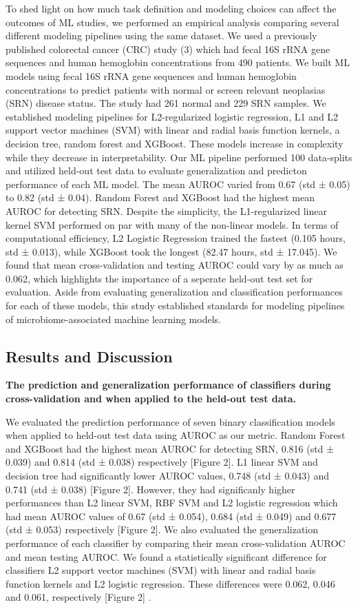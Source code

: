 \documentclass[11pt,]{article}
\begin{document}
To shed light on how much task definition and modeling choices can
affect the outcomes of ML studies, we performed an empirical analysis
comparing several different modeling pipelines using the same dataset.
We used a previously published colorectal cancer (CRC) study (3) which
had fecal 16S rRNA gene sequences and human hemoglobin concentrations
from 490 patients. We built ML models using fecal 16S rRNA gene
sequences and human hemoglobin concentrations to predict patients with
normal or screen relevant neoplasias (SRN) disease status. The study had
261 normal and 229 SRN samples. We established modeling pipelines for
L2-regularized logistic regression, L1 and L2 support vector machines
(SVM) with linear and radial basis function kernels, a decision tree,
random forest and XGBoost. These models increase in complexity while
they decrease in interpretability. Our ML pipeline performed 100
data-splits and utilized held-out test data to evaluate generalization
and predicton performance of each ML model. The mean AUROC varied from
0.67 (std ± 0.05) to 0.82 (std ± 0.04). Random Forest and XGBoost had
the highest mean AUROC for detecting SRN. Despite the simplicity, the
L1-regularized linear kernel SVM performed on par with many of the
non-linear models. In terms of computational efficiency, L2 Logistic
Regression trained the fastest (0.105 hours, std ± 0.013), while XGBoost
took the longest (82.47 hours, std ± 17.045). We found that mean
cross-validation and testing AUROC could vary by as much as 0.062, which
highlights the importance of a seperate held-out test set for
evaluation. Aside from evaluating generalization and classification
performances for each of these models, this study established standards
for modeling pipelines of microbiome-associated machine learning models.

\subsection{Results and Discussion}\label{results-and-discussion}

\textbf{The prediction and generalization performance of classifiers
during cross-validation and when applied to the held-out test data.}

We evaluated the prediction performance of seven binary classification
models when applied to held-out test data using AUROC as our metric.
Random Forest and XGBoost had the highest mean AUROC for detecting SRN,
0.816 (std ± 0.039) and 0.814 (std ± 0.038) respectively {[}Figure 2{]}.
L1 linear SVM and decision tree had significantly lower AUROC values,
0.748 (std ± 0.043) and 0.741 (std ± 0.038) {[}Figure 2{]}. However,
they had significanly higher performances than L2 linear SVM, RBF SVM
and L2 logistic regression which had mean AUROC values of 0.67 (std ±
0.054), 0.684 (std ± 0.049) and 0.677 (std ± 0.053) respectively
{[}Figure 2{]}. We also evaluated the generalization performance of each
classifier by comparing their mean cross-validation AUROC and mean
testing AUROC. We found a statistically significant difference for
classifiers L2 support vector machines (SVM) with linear and radial
basis function kernels and L2 logistic regression. These differences
were 0.062, 0.046 and 0.061, respectively {[}Figure 2{]} .
\end{document}

